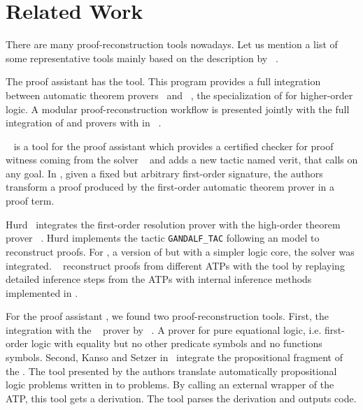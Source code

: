 \documentclass[../main.tex]{subfiles}
\begin{document}

\section{Related Work}
\label{sec:related-work}

There are many proof-reconstruction tools nowadays.
Let us mention a list of some representative tools mainly based on the description by \citeauthor{Sicard-Ramirez2016}~\cite{Sicard-Ramirez2016}.

The  proof assistant has the  tool.
This program provides a full integration between
automatic theorem provers~\cite{meng2006automation,blanchette2013extending,Fleury2014,hurlin07practical,bohme2010,blanchette2013extending} and
~\cite{nipkow2002isabelle}, the specialization of
 for higher-order logic.
A modular proof-reconstruction workflow is presented jointly with
the full integration of  and  provers with  in \citeauthor{Een2004}~\cite{Een2004}.

~\cite{armand2011,Ekici2017} is a tool for the
 proof assistant \cite{coqteam} which provides a certified
checker for proof witness coming from the \SMT solver
~\cite{bouton2009} and adds a new tactic named verit,
that calls  on any  goal.
In \cite{Bezem2002},
given a fixed but arbitrary first-order signature, the authors
transform a proof produced by the first-order automatic theorem
prover  \cite{deNivelle2003} in a  proof
term.

Hurd~\cite{Hurd1999} integrates the first-order resolution prover
 with the high-order
theorem prover ~\cite{norrish2007hol}. Hurd implements the
tactic \verb!GANDALF_TAC! following an  model to reconstruct
 proofs. For , a version of
 but with a simpler logic core, the \SMT solver 
was integrated. \citeauthor{kaliszyk2013}~\cite{kaliszyk2013}
reconstruct proofs from different ATPs with the  tool by
replaying detailed inference steps from the ATPs with internal
inference methods implemented in .

For the proof assistant \Agda, we found two proof-reconstruction tools.
First, the integration with the ~\cite{hillenbrand1997} prover by \citeauthor{foster2011integrating}~\cite{foster2011integrating}.
A prover for pure equational logic, i.e.
first-order logic with equality but no other predicate symbols and no functions symbols.
Second, Kanso and Setzer in~\cite{kanso2016light} integrate the propositional
fragment of the . The tool presented by the authors
translate automatically propositional logic problems written in \Agda
to \TPTP problems. By calling an external wrapper of the ATP, this
tool gets a \TSTP derivation. The tool parses the 
derivation and outputs \Agda code.
\end{document}
